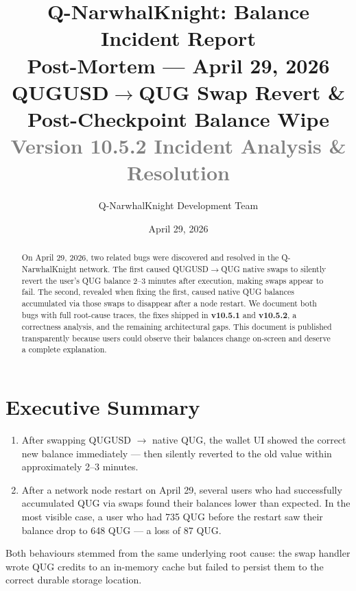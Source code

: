 \documentclass[11pt,a4paper]{article}
\title{%
  \vspace{-1em}%
  {\Large\textbf{Q-NarwhalKnight: Balance Incident Report}}\\[0.4em]
  {\large Post-Mortem — April 29, 2026}\\[0.6em]
  {\normalsize QUGUSD$\to$QUG Swap Revert \& Post-Checkpoint Balance Wipe}\\[0.3em]
  {\small\textcolor{gray}{Version 10.5.2 Incident Analysis \& Resolution}}
}
\author{Q-NarwhalKnight Development Team}
\date{April 29, 2026}
\begin{document}
\maketitle
\thispagestyle{fancy}

\begin{abstract}
\noindent
On April 29, 2026, two related bugs were discovered and resolved in the
Q-NarwhalKnight network. The first caused QUGUSD$\to$QUG native swaps to silently
revert the user's QUG balance 2--3 minutes after execution, making swaps appear
to fail. The second, revealed when fixing the first, caused native QUG balances
accumulated via those swaps to disappear after a node restart.
We document both bugs with full root-cause traces, the fixes shipped in
\textbf{v10.5.1} and \textbf{v10.5.2}, a correctness analysis, and the remaining
architectural gaps. This document is published transparently because users could
observe their balances change on-screen and deserve a complete explanation.
\end{abstract}

\tableofcontents
\newpage

\section{Executive Summary}

\begin{noticebox}
\begin{enumerate}
  \item After swapping QUGUSD $\to$ native QUG, the wallet UI showed the correct
        new balance immediately — then silently reverted to the old value within
        approximately 2--3 minutes.
  \item After a network node restart on April 29, several users who had
        successfully accumulated QUG via swaps found their balances lower than
        expected. In the most visible case, a user who had 735 QUG before the
        restart saw their balance drop to 648 QUG — a loss of 87 QUG.
\end{enumerate}
Both behaviours stemmed from the same underlying root cause: the swap handler
wrote QUG credits to an in-memory cache but failed to persist them to the
correct durable storage location.
\end{noticebox}
\end{document}
